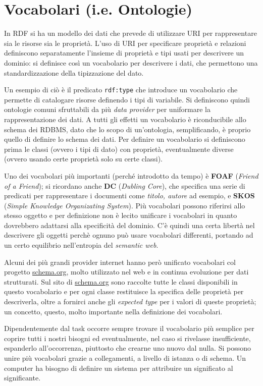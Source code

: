 \documentclass[11pt]{article}
\begin{document}
\section{Vocabolari (i.e. Ontologie)}
In RDF si ha un modello dei dati che prevede di utilizzare URI per rappresentare sia le risorse sia le proprietà.
L'uso di URI per specificare proprietà e relazioni definiscono separatamente l'insieme di proprietà e tipi usati per descrivere un dominio: si definisce così un vocabolario per descrivere i dati, che permettono una standardizzazione della tipizzazione del dato.

Un esempio di ciò è il predicato \verb|rdf:type| che introduce un vocabolario che permette di catalogare risorse definendo i tipi di variabile.
Si definiscono quindi ontologie comuni sfruttabili da più \textit{data provider} per uniformare la rappresentazione dei dati. A tutti gli effetti un vocabolario è riconducibile allo schema dei RDBMS, dato che lo scopo di un'ontologia, semplificando, è proprio quello di definire lo schema dei dati.
Per definire un vocabolario si definiscono prima le classi (ovvero i tipi di dato) con proprietà, eventualmente diverse (ovvero usando certe proprietà solo su certe classi).

Uno dei vocabolari più importanti (perché introdotto da tempo) è \textbf{FOAF} (\textit{Friend of a Friend}); si ricordano anche \textbf{DC} (\textit{Dubling Core}), che specifica una serie di predicati per rappresentare i documenti come \textit{titolo, autore} ad esempio, e \textbf{SKOS} (\textit{Simple Knowledge Organizating System}).
Più vocabolari possono riferirsi allo stesso oggetto e per definizione non è lecito unificare i vocabolari in quanto dovrebbero adattarsi alla specificità del dominio. C'è quindi una certa libertà nel descrivere gli oggetti perchè ognuno può usare vocabolari differenti, portando ad un certo equilibrio nell'entropia del \textit{semantic web}.

Alcuni dei più grandi provider internet hanno però unificato vocabolari col progetto \url{schema.org}, molto utilizzato nel web e in continua evoluzione per dati strutturati. Sul sito di \url{schema.org} sono raccolte tutte le classi disponibili in questo vocabolario e per ogni classe restituisce la specifica delle proprietà per descriverla, oltre a fornirci anche gli \textit{expected type} per i valori di queste proprietà; un concetto, questo, molto importante nella definizione dei vocabolari. 

Dipendentemente dal task occorre sempre trovare il vocabolario più semplice per coprire tutti i nostri bisogni ed eventualmente, nel caso si rivelasse insufficiente, espanderlo all'occorrenza, piuttosto che crearne uno nuovo dal nulla.
Si possono unire più vocabolari grazie a collegamenti, a livello di istanza o di schema. Un computer ha bisogno di definire un sistema per attribuire un significato al significante.
\end{document}
